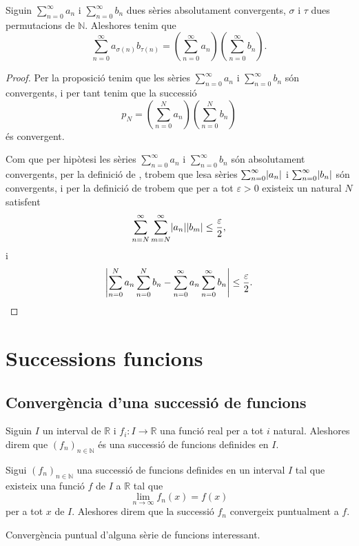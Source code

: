 \documentclass[../Apunts.tex]{subfiles}
\begin{document}
	\begin{theorem}
		Siguin \(\sum_{n=0}^{\infty}a_{n}\) i \(\sum_{n=0}^{\infty}b_{n}\) dues sèries absolutament convergents, \(\sigma\) i \(\tau\) dues permutacions de \(\mathbb{N}\). Aleshores tenim que
		\[\sum_{n=0}^{\infty}a_{\sigma(n)}b_{\tau(n)}=\left(\sum_{n=0}^{\infty}a_{n}\right)\left(\sum_{n=0}^{\infty}b_{n}\right).\]
		\begin{proof}
			Per la proposició  tenim que les sèries \(\sum_{n=0}^{\infty}a_{n}\) i \(\sum_{n=0}^{\infty}b_{n}\) són convergents, i per tant tenim que la successió
			\[p_{N}=\left(\sum_{n=0}^{N}a_{n}\right)\left(\sum_{n=0}^{N}b_{n}\right)\]
			és convergent.
			
			Com que per hipòtesi les sèries \(\sum_{n=0}^{\infty}a_{n}\) i \(\sum_{n=0}^{\infty}b_{n}\) són absolutament convergents, per la definició de , trobem que lesa sèries \(\sum_{n=0}^{\infty}\abs{a_{n}}\) i \(\sum_{n=0}^{\infty}\abs{b_{n}}\) són convergents, i per la definició de  trobem que per a tot \(\varepsilon>0\) existeix un natural \(N\) satisfent
			\[\sum_{n=N}^{\infty}\sum_{m=N}^{\infty}\abs{a_{n}}\abs{b_{m}}\leq\frac{\varepsilon}{2},\]
			i
			\[\abs{\sum_{n=0}^{N}a_{n}\sum_{n=0}^{N}b_{n}-\sum_{n=0}^{\infty}a_{n}\sum_{n=0}^{\infty}b_{n}}\leq\frac{\varepsilon}{2}.\]
		\end{proof}
	\end{theorem}
	\section{Successions funcions}
	\subsection{Convergència d'una successió de funcions}
	\begin{definition}
		\label{def:successió de funcions}
		Siguin \(I\) un interval de \(\mathbb{R}\) i \(f_{i}\colon I\longrightarrow\mathbb{R}\) una funció real per a tot \(i\) natural. Aleshores direm que \((f_{n})_{n\in\mathbb{N}}\) és una successió de funcions definides en \(I\).
	\end{definition}
	\begin{definition}
		\label{def:convergència puntual}
		Sigui \((f_{n})_{n\in\mathbb{N}}\) una successió de funcions definides en un interval \(I\) tal que existeix una funció \(f\) de \(I\) a \(\mathbb{R}\) tal que
		\[\lim_{n\to\infty}f_{n}(x)=f(x)\]
		per a tot \(x\) de \(I\). Aleshores direm que la successió \(f_{n}\) convergeix puntualment a \(f\).
	\end{definition}
	\begin{example}
		Convergència puntual d'alguna sèrie de funcions interessant.
	\end{example}
\end{document}
